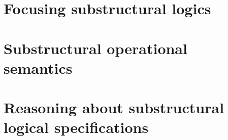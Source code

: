 \documentclass[12pt]{cmuthesis}
\begin{document}
\tableofcontents
\listoffigures %

\mainmatter


%
%
%
%
%




\part{Focusing substructural logics}







\part{Substructural operational semantics}









\part{Reasoning about substructural logical specifications}




\end{document}
